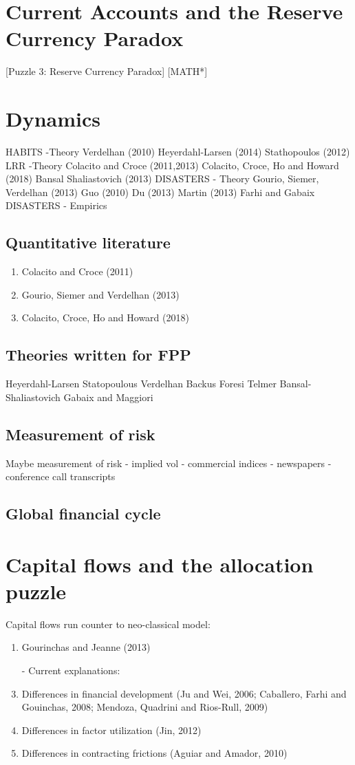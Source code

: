 \documentclass{ar-1col}
\begin{document}
\section{Current Accounts and the Reserve Currency Paradox}
[Puzzle 3: Reserve Currency Paradox] [MATH*]

\section{Dynamics}

HABITS -Theory Verdelhan (2010) Heyerdahl-Larsen (2014) Stathopoulos
(2012) LRR -Theory Colacito and Croce (2011,2013) Colacito, Croce, Ho
and Howard (2018) Bansal Shaliastovich (2013) DISASTERS - Theory
Gourio, Siemer, Verdelhan (2013) Guo (2010) Du (2013) Martin (2013)
Farhi and Gabaix DISASTERS - Empirics


\subsection{Quantitative literature}
\begin{enumerate}
\item Colacito and Croce (2011)
\item Gourio, Siemer and Verdelhan (2013)
\item Colacito, Croce, Ho and Howard (2018)
\end{enumerate}
\subsection{Theories written for FPP}
Heyerdahl-Larsen Statopoulous Verdelhan Backus Foresi Telmer
Bansal-Shaliastovich Gabaix and Maggiori
\subsection{Measurement of risk}
Maybe measurement of risk - implied vol - commercial indices -
newspapers - conference call transcripts
\subsection{Global financial cycle}

\section{Capital flows and the allocation puzzle}
Capital flows run counter to neo-classical model:
\begin{enumerate}
\item Gourinchas and Jeanne (2013)
\item[-] Current explanations:
\item Differences in financial development (Ju and Wei, 2006;
  Caballero, Farhi and Gouinchas, 2008; Mendoza, Quadrini and
  Rios-Rull, 2009)
\item Differences in factor utilization (Jin, 2012)
\item Differences in contracting frictions (Aguiar and Amador, 2010)
\end{enumerate}
\end{document}
